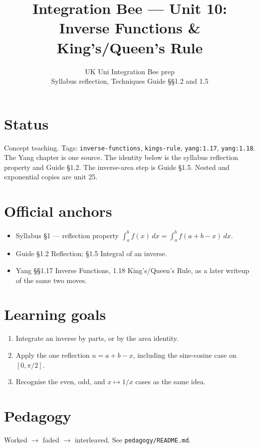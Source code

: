 
\title{Integration Bee --- Unit 10:\\ Inverse Functions \& King's/Queen's Rule}
\author{UK Uni Integration Bee prep\\ Syllabus reflection, Techniques Guide \S\S1.2 and 1.5}
\date{}

\maketitle
\section*{Status}
Concept teaching. Tags: \texttt{inverse-functions}, \texttt{kings-rule}, \texttt{yang:1.17}, \texttt{yang:1.18}.
The Yang chapter is one source. The identity below is the syllabus reflection property and Guide \S1.2. The inverse-area step is Guide \S1.5. Nested and exponential copies are unit 25.
\section{Official anchors}
\begin{itemize}
  \item Syllabus \S1 --- reflection property $\int_a^b f(x)\,dx=\int_a^b f(a+b-x)\,dx$.
  \item Guide \S1.2 Reflection; \S1.5 Integral of an inverse.
  \item Yang \S\S1.17 Inverse Functions, 1.18 King's/Queen's Rule, as a later writeup of the same two moves.
\end{itemize}
\section{Learning goals}
\begin{enumerate}
  \item Integrate an inverse by parts, or by the area identity.
  \item Apply the one reflection $u=a+b-x$, including the sine-cosine case on $[0,\pi/2]$.
  \item Recognise the even, odd, and $x\mapsto 1/x$ cases as the same idea.
\end{enumerate}
\section{Pedagogy}
Worked $\to$ faded $\to$ interleaved. See \texttt{pedagogy/README.md}.

